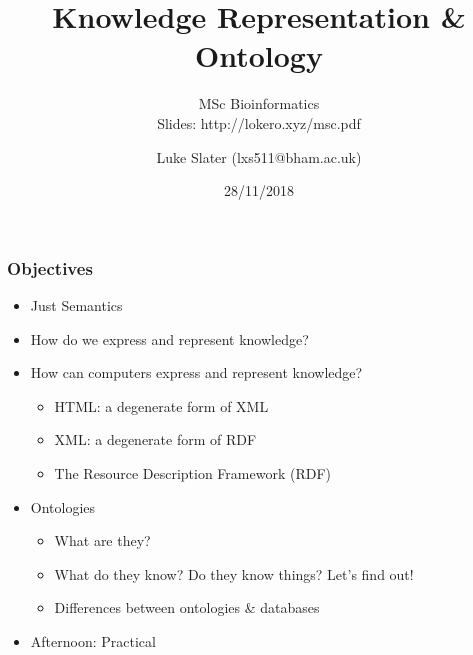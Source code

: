 \documentclass{beamer}
\title{Knowledge Representation \& Ontology}
\subtitle{MSc Bioinformatics \\ Slides: http://lokero.xyz/msc.pdf}
\author{Luke Slater (lxs511@bham.ac.uk)}
\institute{Centre for Computational Biology \\ University of Birmingham}
\date{28/11/2018}
\begin{document}
\frame{\titlepage}

\begin{frame}
\frametitle{Objectives}

\begin{itemize}
  \item Just Semantics
  \item How do we express and represent knowledge?
  \item How can computers express and represent knowledge?
  \begin{itemize} 
    \item HTML: a degenerate form of XML
    \item XML: a degenerate form of RDF
    \item The Resource Description Framework (RDF)
  \end{itemize}
  \item Ontologies
  \begin{itemize} 
    \item What are they?
    \item What do they know? Do they know things? Let's find out!
    \item Differences between ontologies \& databases
  \end{itemize}
  \item Afternoon: Practical
\end{itemize}
\end{frame}
\end{document}
